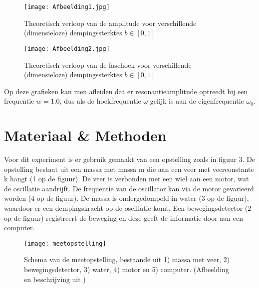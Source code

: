 \documentclass[12pt,a4]{article}
\begin{document}
\begin{figure}[h]
\centering
\texttt{[image: Afbeelding1.jpg]}
\caption{Theoretisch verloop van de amplitude voor verschillende (dimensieloze) dempingssterktes $b \in [0,1]$ }
\end{figure}

\begin{figure}[h]
\centering
\texttt{[image: Afbeelding2.jpg]}
\caption{Theoretisch verloop van de fasehoek voor verschillende (dimensieloze) dempingssterktes $b \in [0,1]$ }
\end{figure}


Op deze grafieken kan men afleiden dat er resonantieamplitude optreedt bij een frequentie $w = 1.0$, dus als de hoekfrequentie $\omega$ gelijk is aan de eigenfrequentie $\omega_0$.

\section{Materiaal \& Methoden}
Voor dit experiment is er gebruik gemaakt van een opstelling zoals in figuur 3. De opstelling bestaat uit een massa met massa m die aan een veer met veerconstante k hangt (1 op de figuur). De veer is verbonden met een wiel aan een motor, wat de oscillatie aandrijft. De frequentie van de oscillator kan via de motor gevarieerd worden (4 op de figuur). De massa is ondergedompeld in water (3 op de figuur), waardoor er een dempingskracht op de oscillatie komt. Een bewegingsdetector (2 op de figuur) registreert de beweging en deze geeft de informatie door aan een computer. 

\begin{figure}[h]
\centering
\texttt{[image: meetopstelling]}
\caption{Schema van de meetopstelling, bestaande uit 1) massa met veer, 2) bewegingsdetector, 3) water, 4) motor en 5) computer. (Afbeelding en beschrijving uit \cite{a})}
\end{figure}
\end{document}
